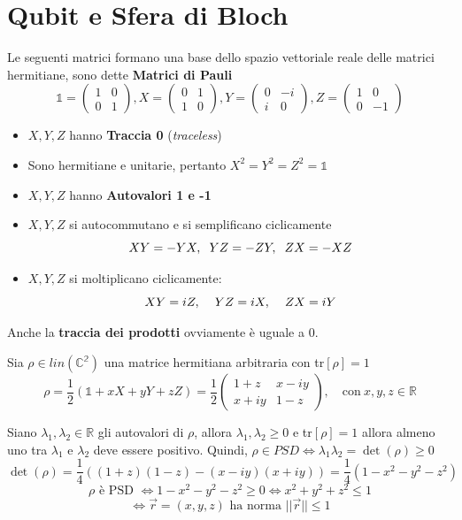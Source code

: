\documentclass{report}
\begin{document}
\section{Qubit e Sfera di Bloch}
Le seguenti  matrici formano una base dello spazio vettoriale reale delle matrici hermitiane, sono dette \textbf{Matrici di Pauli}
$$
\mathbb{1}=
\begin{pmatrix}
    1 & 0\\
    0 & 1
\end{pmatrix}
, X =
\begin{pmatrix}
    0 & 1\\
    1 & 0
\end{pmatrix}
, Y=
\begin{pmatrix}
    0 & -i\\
    i & 0
\end{pmatrix}
, Z =
\begin{pmatrix}
    1 & 0 \\
    0 & -1
\end{pmatrix}
$$
\begin{itemize}
    \item $X,Y,Z$ hanno \textbf{Traccia 0} (\textit{traceless})
    \item Sono hermitiane e unitarie, pertanto $X^2=Y^2=Z^2=\mathbb{1}$
    \item $X,Y,Z$ hanno \textbf{Autovalori 1 e -1}
    \item $X,Y,Z$ si autocommutano e si semplificano ciclicamente
    $$XY = -YX, \hspace{0.2cm} YZ = -ZY,  \hspace{0.2cm} ZX = -XZ$$
    \item $X,Y,Z$ si moltiplicano ciclicamente:
    $$XY = iZ, \hspace{0.4cm} YZ = iX,  \hspace{0.4cm} ZX = iY$$ 
\end{itemize}
Anche la \textbf{traccia dei prodotti} ovviamente è uguale a 0.

Sia $\rho \in \textit{lin}(\mathbb{C^2})$ una matrice hermitiana arbitraria con tr$[\rho] = 1$
$$\rho = \frac{1}{2}\left( \mathbb{1} + xX + yY+zZ\right) = \frac{1}{2}
\begin{pmatrix}
    1+z & x-iy \\
    x+iy & 1-z
\end{pmatrix}, \quad \text{con}\  x,y,z\in \mathbb{R}$$
 
Siano $\lambda_1,\lambda_2 \in \mathbb{R}$ gli autovalori di $\rho$, allora $\lambda_1,\lambda_2 \ge 0$ e tr$[\rho]=1$
allora almeno uno tra $\lambda_1$ e $\lambda_2$ deve essere positivo. Quindi, $\rho \in \textit{PSD} \Leftrightarrow \lambda_1\lambda_2=\det(\rho)\ge0$
$$\det(\rho) = \frac{1}{4}\left( (1+z) (1-z) - (x-iy) (x+iy) \right) = \frac{1}{4}(1-x^2-y^2-z^2)$$
$$\rho \text{ è PSD } \Longleftrightarrow 1-x^2-y^2-z^2\ge 0 \Longleftrightarrow x^2+y^2+z^2 \le 1$$
$$ \Longleftrightarrow \vec{r}= (x,y,z) \text{ ha norma } ||\vec{r}|| \le1$$
\end{document}

